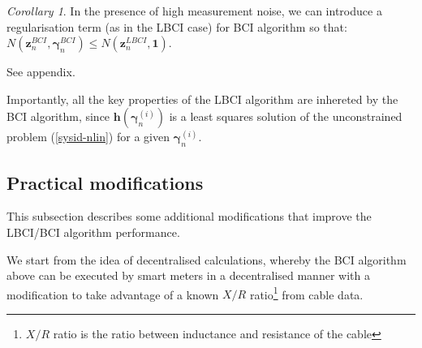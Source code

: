 \documentclass[journal,10pt,onecolumn,draftclsnofoot,]{IEEEtran}
\makeatletter
\theoremstyle{plain}
\theoremstyle{definition}
\theoremstyle{remark}
\newtheorem*{corollary}{Corollary}
\renewenvironment{proof}[1][\proofname]{\par
  \pushQED{\qed}%
  \normalfont \topsep6\p@\@plus6\p@\relax
  \list{}{%
    \settowidth{\leftmargin}{\itshape\proofname:\hskip\labelsep}%
    \setlength{\labelwidth}{0pt}%
    \setlength{\itemindent}{-\leftmargin}%
  }%
  \item[\hskip\labelsep\itshape#1\@addpunct{:}]\ignorespaces
}{%
  \popQED\endlist\@endpefalse
}
\makeatother
\begin{document}
\begin{corollary} \label{corollary} In the presence of high measurement noise, we can introduce a regularisation term (as in the LBCI case) for BCI algorithm so that:
$N(\bm{z}_n^{BCI}, \bm{\gamma}^{BCI}_{n}) \le N(\bm{z}_n^{LBCI}, \bm{1})$. 
\begin{proof}
See appendix.
\end{proof}

\begin{comment}
To see this, note that:
\begin{equation*}
\begin{split}
{}& N(\bm{z}_n^{BCI}, \bm{\gamma}^{BCI}_{n}) \le \Big\|\big[ \bm{I} - \bm{J}_{n}\bm{Q}_1\big[ \bm{J}_{n}\bm{Q}_1 \big]^{\dagger}\big](\bm{V}_{n-1} - \bm{v}_{n})\Big\|_2^2 \le \\
& \Big\|\big[ \bm{I} - \bm{J}_{n}\bm{Q}_1\big[ \bm{J}_{n}\bm{Q}_1 \big]^{\dagger}\big](\bm{V}_{n-1} - \bm{v}_{n})\Big\|_2^2 + \mu \big\|\bm{J}_{n}\bm{Q}_2\bm{z}^{BCI}_{n} \big\|_2^2 \le \\
& \Big\|\big[ \bm{I} - \bm{J}_{n}\bm{Q}_1\big[ \bm{J}_{n}\bm{Q}_1 \big]^{\dagger}\big](\bm{V}_{n-1} - \bm{v}_{n})\Big\|_2^2 + \big\|\bm{J}_{n}\bm{Q}_2\bm{z}^{LBCI}_{n} \big\|_2^2 = \\
& N(\bm{z}_n^{LBCI}, \bm{1}),
\end{split}
\end{equation*}
where $0 \le \mu \le 1$ is a regularisation parameter.
\end{comment}
\end{corollary}
Importantly, all the key properties of the LBCI algorithm are inhereted by the BCI algorithm, since $\bm{h}(\bm{\gamma}_{n}^{(i)})$ is a least squares solution of the unconstrained problem (\ref{sysid-nlin}) for a given $\bm{\gamma}_{n}^{(i)}$. 

\subsection{Practical modifications}
\label{practical_modifications_section}
This subsection describes some additional modifications that improve the LBCI/BCI algorithm performance. 

We start from the idea of decentralised calculations, whereby the BCI algorithm above can be executed by smart meters in a decentralised manner with a modification to take advantage of a known $X/R$ ratio\footnote{$X/R$ ratio is the ratio between inductance and resistance of the cable} from cable data. 
\end{document}
